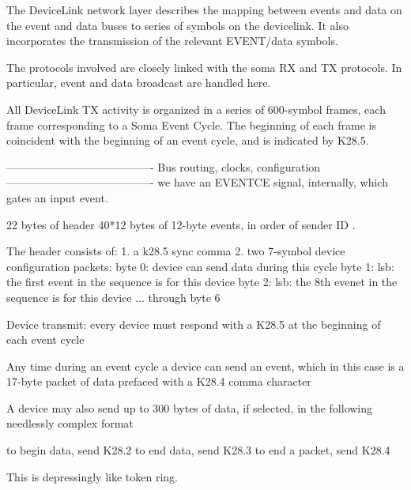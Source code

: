 
The DeviceLink network layer describes the mapping between events and data on the event and data buses to series of symbols on the devicelink. It also incorporates the transmission of the relevant EVENT/data symbols. 



The protocols involved are closely linked with the soma RX and TX protocols. In particular, event and data broadcast are handled here. 


All DeviceLink TX activity is organized in a series of 600-symbol frames, each frame corresponding to a Soma Event Cycle. The beginning of each frame is coincident with the beginning of an event cycle, and is indicated by K28.5. 


----------------------------------------
Bus routing, clocks, configuration
----------------------------------------
we have an EVENTCE signal, internally, which gates an input event. 

22 bytes of header
40*12 bytes of 12-byte events, in order of sender ID .

The header consists of:
1. a k28.5 sync comma
2. two 7-symbol device configuration packets:
byte 0: device can send data during this cycle
byte 1: lsb: the first event in the sequence is for this device
byte 2: lsb: the 8th evenet in the sequence is for this device
... through byte 6


Device transmit:
every device must respond with a K28.5 at the beginning of each event cycle

Any time during an event cycle a device can send an event, which in this case is a 17-byte packet of data prefaced with a K28.4 comma character

A device may also send up to 300 bytes of data, if selected, in the following needlessly complex format

to begin data, send K28.2
to end data, send K28.3
to end a packet, send K28.4

This is depressingly like token ring. 



